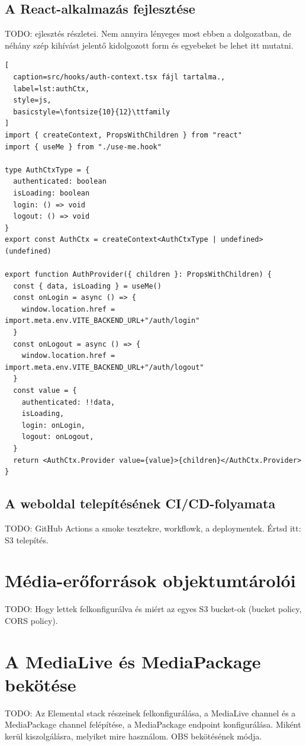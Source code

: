 \subsection{A React-alkalmazás fejlesztése}

TODO: ejlesztés részletei. Nem annyira lényeges most ebben a dolgozatban, de néhány szép kihívást jelentő kidolgozott form és egyebeket be lehet itt mutatni.

\begin{minipage}{0.92\textwidth}
  \begin{lstlisting}[
  caption=src/hooks/auth-context.tsx fájl tartalma.,
  label=lst:authCtx,
  style=js,
  basicstyle=\fontsize{10}{12}\ttfamily
]
import { createContext, PropsWithChildren } from "react"
import { useMe } from "./use-me.hook"

type AuthCtxType = {
  authenticated: boolean
  isLoading: boolean
  login: () => void
  logout: () => void
}
export const AuthCtx = createContext<AuthCtxType | undefined>(undefined)

export function AuthProvider({ children }: PropsWithChildren) {
  const { data, isLoading } = useMe()
  const onLogin = async () => {
    window.location.href = import.meta.env.VITE_BACKEND_URL+"/auth/login"
  }
  const onLogout = async () => {
    window.location.href = import.meta.env.VITE_BACKEND_URL+"/auth/logout"
  }
  const value = {
    authenticated: !!data,
    isLoading,
    login: onLogin,
    logout: onLogout,
  }
  return <AuthCtx.Provider value={value}>{children}</AuthCtx.Provider>
}
\end{lstlisting}
\end{minipage}

\subsection{A weboldal telepítésének CI/CD-folyamata}

TODO: GitHub Actions a smoke tesztekre, workflowk, a deploymentek. Értsd itt: S3 telepítés.

\section{Média-erőforrások objektumtárolói}

TODO: Hogy lettek felkonfigurálva és miért az egyes S3 bucket-ok (bucket policy, CORS policy).

\section{A MediaLive és MediaPackage bekötése}

TODO: Az Elemental stack részeinek felkonfigurálása, a MediaLive channel és a MediaPackage channel felépítése, a MediaPackage endpoint konfigurálása. Miként kerül kiszolgálásra, melyiket mire használom. OBS bekötésének módja.
